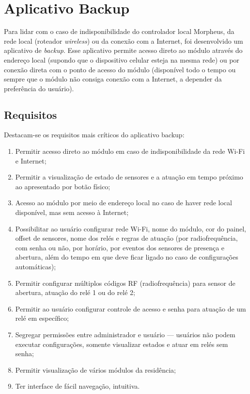 \section{Aplicativo Backup}

Para lidar com o caso de indisponibilidade do controlador local Morpheus, da rede local (roteador \emph{wireless}) ou da conexão com a Internet, foi desenvolvido um aplicativo de \textit{backup}. Esse aplicativo permite acesso direto ao módulo através do endereço local (supondo que o dispositivo celular esteja na mesma rede) ou por conexão direta com o ponto de acesso do módulo (disponível todo o tempo ou sempre que o módulo não consiga conexão com a Internet, a depender da preferência do usuário).

\subsection{Requisitos}

Destacam-se os requisitos mais críticos do aplicativo backup:

\begin{enumerate}
	\item Permitir acesso direto ao módulo em caso de indisponibilidade da rede Wi-Fi e Internet;
	\item Permitir a visualização de estado de sensores e a atuação em tempo próximo ao apresentado por botão físico;
	\item Acesso ao módulo por meio de endereço local no caso de haver rede local disponível, mas sem acesso à Internet;
	\item Possibilitar ao usuário configurar rede Wi-Fi, nome do módulo, cor do painel, offset de sensores, nome dos relés e regras de atuação (por radiofrequência, com senha ou não, por horário, por eventos dos sensores de presença e abertura, além do tempo em que deve ficar ligado no caso de configurações automáticas);
	\item Permitir configurar múltiplos códigos RF (radiofrequência) para sensor de abertura, atuação do relé 1 ou do relé 2;
	\item Permitir ao usuário configurar controle de acesso e senha para atuação de um relé em específico;
	\item Segregar permissões entre administrador e usuário --- usuários não podem executar configurações, somente visualizar estados e atuar em relés sem senha;
	\item Permitir visualização de vários módulos da residência;
	\item Ter interface de fácil navegação, intuitiva.
\end{enumerate}

